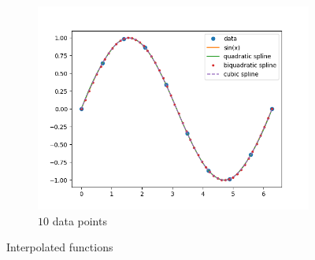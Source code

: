 \documentclass[12pt]{article}
\begin{document}
\begin{figure}[h]
\begin{subfigure}[h]{0.3\textwidth}
		\includegraphics[width=\textwidth]{1cn10.png}
		\caption{$10$ data points}
	\end{subfigure}
	\caption{Interpolated functions}
\end{figure}
\end{document}
